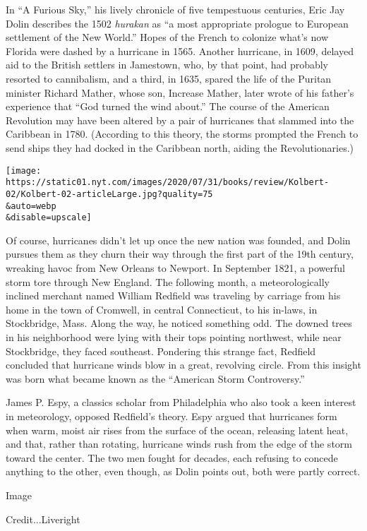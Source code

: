 In ``A Furious Sky,'' his lively chronicle of five tempestuous
centuries, Eric Jay Dolin describes the 1502 \emph{hurakan} as ``a most
appropriate prologue to European settlement of the New World.'' Hopes of
the French to colonize what's now Florida were dashed by a hurricane in
1565. Another hurricane, in 1609, delayed aid to the British settlers in
Jamestown, who, by that point, had probably resorted to cannibalism, and
a third, in 1635, spared the life of the Puritan minister Richard
Mather, whose son, Increase Mather, later wrote of his father's
experience that ``God turned the wind about.'' The course of the
American Revolution may have been altered by a pair of hurricanes that
slammed into the Caribbean in 1780. (According to this theory, the
storms prompted the French to send ships they had docked in the
Caribbean north, aiding the Revolutionaries.)

\texttt{[image: https://static01.nyt.com/images/2020/07/31/books/review/Kolbert-02/Kolbert-02-articleLarge.jpg?quality=75\\\&auto=webp\\\&disable=upscale]}

Of course, hurricanes didn't let up once the new nation was founded, and
Dolin pursues them as they churn their way through the first part of the
19th century, wreaking havoc from New Orleans to Newport. In September
1821, a powerful storm tore through New England. The following month, a
meteorologically inclined merchant named William Redfield was traveling
by carriage from his home in the town of Cromwell, in central
Connecticut, to his in-laws, in Stockbridge, Mass. Along the way, he
noticed something odd. The downed trees in his neighborhood were lying
with their tops pointing northwest, while near Stockbridge, they faced
southeast. Pondering this strange fact, Redfield concluded that
hurricane winds blow in a great, revolving circle. From this insight was
born what became known as the ``American Storm Controversy.''

James P. Espy, a classics scholar from Philadelphia who also took a keen
interest in meteorology, opposed Redfield's theory. Espy argued that
hurricanes form when warm, moist air rises from the surface of the
ocean, releasing latent heat, and that, rather than rotating, hurricane
winds rush from the edge of the storm toward the center. The two men
fought for decades, each refusing to concede anything to the other, even
though, as Dolin points out, both were partly correct.

Image

Credit...Liveright

